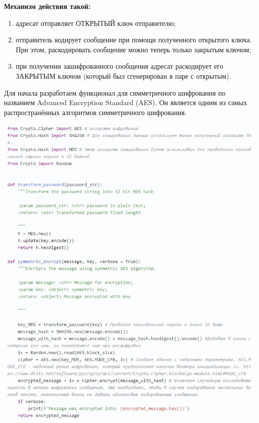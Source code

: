 \documentclass[12pt]{article}
\begin{document}
	\textbf{Механизм действия такой:}
	
	\begin{enumerate}
	\item адресат отправляет ОТКРЫТЫЙ ключ отправителю;
	\item отправитель кодирует сообщение при помощи полученного открытого ключа. При этом, раскодировать сообщение можно теперь только закрытым ключом;
	\item при получении зашифрованного сообщения адресат раскодирует его ЗАКРЫТЫМ ключом (который был сгенерирован в паре с открытым).
	
	\end{enumerate}
	\vspace{0.5cm}
	
	Для начала разработаем функционал для симметричного шифрования по названием Advanced Encryption Standard (AES). Он является одним из самых распространённых алгоритмов симметричного шифрования.
	
	\begin{center}
		\includegraphics[width=1\linewidth]{pictures/code1.jpg}
	\end{center}
\end{document}
